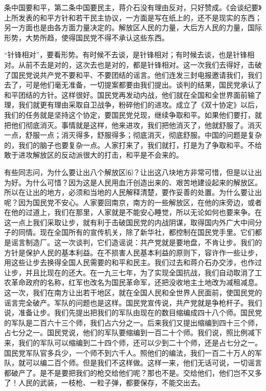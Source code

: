 \documentclass[UTF-8, a5paper, 12pt]{ctexart}
\begin{document}
条中国要和平，第二条中国要民主，蒋介石没有理由反对，只好赞成。《会谈纪要》上所发表的和平方针和若干民主协议，一方面是写在纸上的，还不是现实的东西；另一方面也是由各方面力量决定的。解放区人民的力量，大后方人民的力量，国际形势，大势所趋，使得国民党不得不承认这些东西。

“针锋相对”，要看形势。有时候不去谈，是针锋相对；有时候去谈，也是针锋相对。从前不去是对的，这次去也是对的，都是针锋相对。这一次我们去得好，击破了国民党说共产党不要和平、不要团结的谣言。他们连发三封电报邀请我们，我们去了，可是他们毫无准备，一切提案都要由我们提出。谈判的结果，国民党承认了和平团结的方针。这样很好。国民党再发动内战，他们就在全国和全世界面前输了理，我们就更有理由采取自卫战争，粉碎他们的进攻。成立了《双十协定》以后，我们的任务就是坚持这个协定，要国民党兑现，继续争取和平。如果他们要打，就把他们彻底消灭。事情就是这样，他来进攻，我们把他消灭了，他就舒服了。消灭一点，舒服一点；消灭得多，舒服得多；彻底消灭，彻底舒服。中国的问题是复杂的，我们的脑子也要复杂一点。人家打来了，我们就打，打是为了争取和平。不给敢于进攻解放区的反动派很大的打击，和平是不会来的。

有些同志问，为什么要让出八个解放区⑹？让出这八块地方非常可惜，但是以让出为好。为什么可惜？因为这是人民用血汗创造出来的、艰苦地建设起来的解放区。所以在让出的地方，必须和当地的人民解释清楚，要作妥善的处置。为什么要让出呢？因为国民党不安心。人家要回南京，南方的一些解放区，在他的床旁边，或者在他的过道上，我们在那里，人家就是不能安心睡觉，所以无论如何也要来争。在这一点上我们采取让步，就有利于击破国民党的内战阴谋，取得国内外广大中间分子的同情。现在全国所有的宣传机关，除了新华社，都控制在国民党手里。它们都是谣言制造厂。这一次谈判，它们造谣说：共产党就是要地盘，不肯让步。我们的方针是保护人民的基本利益。在不损害人民基本利益的原则下，容许作一些让步，用这些让步去换得全国人民需要的和平和民主。我们过去和蒋介石办交涉，也作过让步，并且比现在的还大。在一九三七年，为了实现全国抗战，我们自动取消了工农革命政府的名称，红军也改名为国民革命军，还把没收地主土地改为减租减息。这一次，我们在南方让出若干地区，就在全国人民和全世界人民面前，使国民党的谣言完全破产。军队的问题也是这样。国民党宣传说，共产党就是争枪杆子。我们说，准备让步。我们先提出把我们的军队由现在的数目缩编成四十八个师。国民党的军队是二百六十三个师，我们占六分之一。后来我们又提出缩编到四十三个师，占七分之一。国民党说，他们的军队要缩编到一百二十个师。我们说，照比例减下来，我们的军队可以缩编到二十四个师，还可以少到二十个师，还是占七分之一。国民党军队官多兵少，一个师不到六千人。照他们的编法，我们一百二十万人的军队，就可以编二百个师。但是我们不这样做。这样一来，他们无话可说，一切谣言都破产了。是不是要把我们的枪交给他们呢？那也不是。交给他们，他们岂不又多了！人民的武装，一枝枪、一粒子弹，都要保存，不能交出去。
\end{document}

